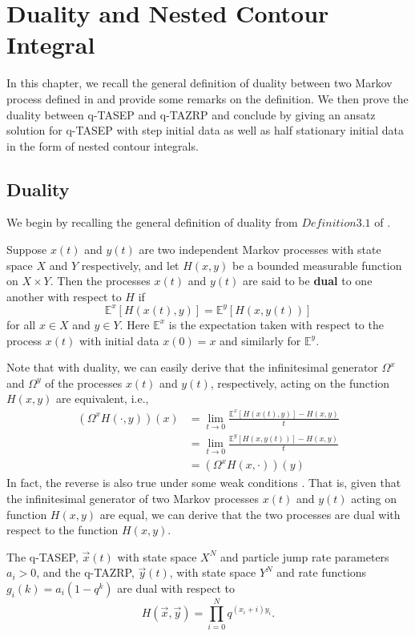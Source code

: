 \chapter{Duality and Nested Contour Integral}
In this chapter, we recall the general definition of duality between two Markov process defined in \cite{interacting-particle-system} and provide some remarks on the definition. We then prove the duality between q-TASEP and q-TAZRP and conclude by giving an ansatz solution for q-TASEP with step initial data as well as half stationary initial data in the form of nested contour integrals.

\section{Duality}
We begin by recalling the general definition of duality from $Definition 3.1$ of \cite{interacting-particle-system}.
\begin{definition}
Suppose $x(t)$ and $y(t)$ are two independent Markov processes with state space $X$ and $Y$ respectively, and let $H(x,y)$ be a bounded measurable function on $X\times Y$. Then the processes $x(t)$ and $y(t)$ are said to be \textbf{dual} to one another with respect to $H$ if $$\mathbb{E}^{x}[H(x(t),y)] = \mathbb{E}^{y}[H(x,y(t))]$$ for all $x \in X$ and $y \in Y$. Here $\mathbb{E}^x$ is the expectation taken with respect to the process $x(t)$ with initial data $x(0) = x$ and similarly for $\mathbb{E}^y$.
\end{definition}
Note that with duality, we can easily derive that the infinitesimal generator $\Omega^x$ and $\Omega^y$ of the processes $x(t)$ and $y(t)$, respectively, acting on the function $H(x,y)$ are equivalent, i.e., 
\begin{align*}
(\Omega^x H(\cdot,y))(x) &= \lim_{t \rightarrow 0} \frac{\mathbb{E}^{x}[H(x(t),y)] - H(x,y)}{t}\\
												&= \lim_{t \rightarrow 0} \frac{\mathbb{E}^{y}[H(x,y(t))] - H(x,y)}{t}\\
												&= (\Omega^x H(x,\cdot))(y)
\end{align*}
In fact, the reverse is also true under some weak conditions \cite{generator-duality}. That is, given that the infinitesimal generator of two Markov processes $x(t)$ and $y(t)$ acting on function $H(x,y)$ are equal, we can derive that the two processes are dual with respect to the function $H(x,y)$. 

\begin{theorem}
\label{thm-duality}
The q-TASEP, $\vec{x}(t)$ with state space $X^N$ and particle jump rate parameters $a_i>0$, and the q-TAZRP, $\vec{y}(t)$, with state space $Y^N$ and rate functions $g_i(k)=a_i(1-q^k)$ are dual with respect to $$H(\vec{x},\vec{y}) = \prod_{i=0}^{N} q^{(x_i + i)y_i}.$$
\end{theorem}

